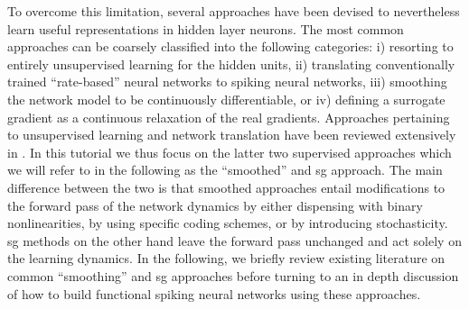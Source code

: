 \documentclass[journal,onecolumn,11pt]{IEEEtran}
\begin{document}
To overcome this limitation, several approaches have been devised to nevertheless
learn useful representations in hidden layer neurons.
The most common approaches can be coarsely classified into the following
categories: 
i) resorting to entirely unsupervised learning for the hidden units, 
ii) translating conventionally trained ``rate-based'' neural networks to spiking
neural networks,
iii) smoothing the network model to be continuously differentiable, or 
iv) defining a surrogate gradient as a continuous relaxation of the real
gradients.  
Approaches pertaining to unsupervised learning and network translation have been
reviewed extensively in \cite{tavanaei_deep_2018}. 
In this tutorial we thus focus on the latter two supervised approaches which we will refer to in the following as the ``smoothed'' and \gls{sg} approach.
The main difference between the two is that smoothed approaches entail modifications to the forward pass of the network dynamics by either dispensing
with binary nonlinearities, by using specific coding schemes, or by introducing stochasticity.  
\Gls{sg} methods on the other hand leave the forward pass unchanged and act solely on the learning dynamics. 
In the following, we briefly review existing literature on common ``smoothing'' and \gls{sg} approaches before turning to an in depth discussion of how to build functional spiking neural networks using these approaches. 
%
%
%
%
%
\end{document}
